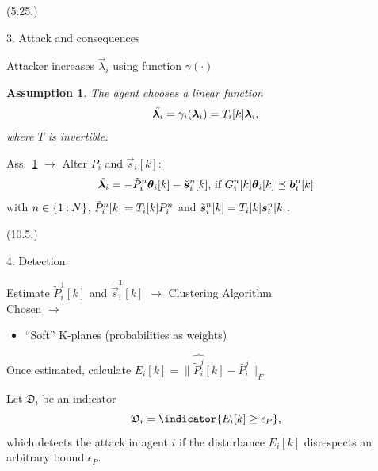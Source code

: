 \documentclass[presentation]{beamer}
\newtheorem{assumption}{Assumption}%
\begin{document}
\begin{frame}
  \begin{textblock}{5.1}(5.25,\secrow)
    \begin{block}{3. Attack and consequences}
        \begin{center}
        \begin{minipage}[c]{.95\textwidth}
      Attacker increases $\vec{\lambda}_{i}$ using function $\gamma(\cdot)$
      \begin{assumption}\label{ass:linear_cheating}
        The agent chooses a linear function
          \begin{equation}\label{eq:cheating}
            \tilde{\lambdai}=\gamma_{i}(\vec{\lambda}_{i})=\Tik\vec{\lambda}_{i},
          \end{equation}
          where $T$ is invertible.
      \end{assumption}

      Ass.~\ref{ass:linear_cheating} $\to$ Alter $P_{i}$ and $\vec{s}_{i}[k]$:
      \begin{equation}
        \tilde{\lambdai}=
        -\tilde{P}_{i}^{n}\thetaik-\tilde{\vec{s}}_{i}^{n}[k]\text{, if}\ G_{i}^{n}[k]\thetaik \preceq \vec{b}_{i}^{n}[k]
      \end{equation}
      with $n\in\{1\mathbin{:} N\}$, $\tilde{P}_{i}^{n}[k]=\Tik P_{i}^{n}$ and $\tilde{\vec{s}}_{i}^{n}[k]=\Tik\vec{s}_{i}^{n}[k]$.
      \end{minipage}
      \end{center}
    \end{block}
  \end{textblock}


  \begin{textblock}{5.1}(10.5,\secrow)
    \begin{block}{4. Detection }
      \begin{center}
        \begin{minipage}[c]{.95\textwidth}
          Estimate $\tilde{P}_{i}^{1}[k]$ and $\tilde{\vec{s}}_{i}^{1}[k]$ $\to$ Clustering Algorithm\\[.5cm]
          Chosen $\to$ \EM{}
          \begin{itemize}
            \item ``Soft'' K-planes (probabilities as weights)
          \end{itemize}

Once estimated, calculate \underline{${E_{i}[k] =\|\widehat{\tilde{P}_{i}^{j}}[k]-\bar{P}_{i}^{j}\|_{F}}$}

Let ${\mathfrak{D}_{i}}$ be an indicator
\begin{equation}
  \label{eq:2}
  \mathfrak{D}_{i}=\indicator{E_{i}[k]\geq\epsilon_{P}},
\end{equation}
which detects the attack in agent $i$
if the disturbance $E_{i}[k]$ disrespects an arbitrary bound $\epsilon_{P}$.
        \end{minipage}
      \end{center}
    \end{block}
  \end{textblock}


\end{frame}
\end{document}
